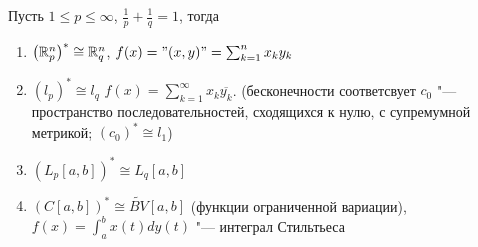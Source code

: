 \documentclass[main]{subfiles}
\begin{document}
\begin{exercise}
  Пусть $1 \le p \le \infty$, $\frac{1}{p} + \frac{1}{q} = 1$, тогда
  \begin{enumerate}
    \item $\left(\mathbb{R}^n_p\right)^* \cong \mathbb{R}^n_q$,
      $f(x) = "(x, y)" = \sum_{k=1}^n x_k y_k$
    \item $(l_p)^* \cong l_q$
      $f(x) = \sum_{k = 1}^\infty x_k \overline{y_k}$.
      (бесконечности соответсвует $c_0$ "--- пространство
      последовательностей, сходящихся к нулю, с супремумной метрикой;
      $(c_0)^* \cong l_1$)
    \item $\left( L_p[a, b] \right)^* \cong L_q[a, b]$
    \item $\left( C[a,b] \right)^* \cong \widetilde{BV}[a,b]$
      (функции ограниченной вариации), $f(x) = \int_a^b x(t) dy(t)$ "---
      интеграл Стильтьеса
  \end{enumerate}
\end{exercise}
\end{document}
